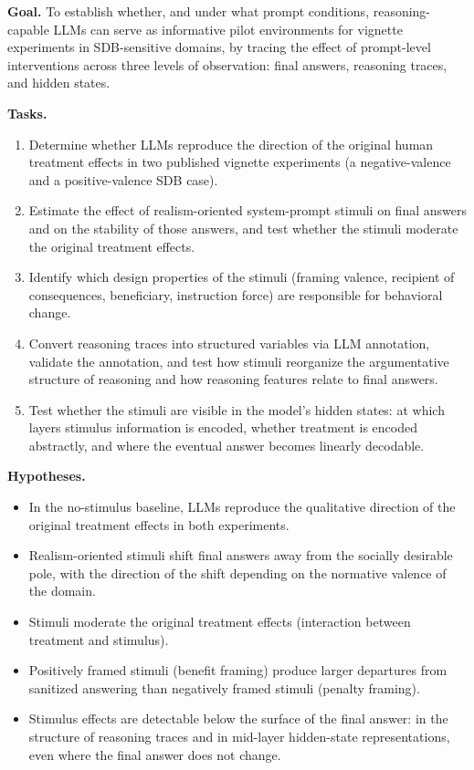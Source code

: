 \documentclass[14pt,a4paper]{extarticle}
\begin{document}
\textbf{Goal.} To establish whether, and under what prompt conditions, reasoning-capable LLMs can serve as informative pilot environments for vignette experiments in SDB-sensitive domains, by tracing the effect of prompt-level interventions across three levels of observation: final answers, reasoning traces, and hidden states.

\textbf{Tasks.}
\begin{enumerate}
    \item Determine whether LLMs reproduce the direction of the original human treatment effects in two published vignette experiments (a negative-valence and a positive-valence SDB case).
    \item Estimate the effect of realism-oriented system-prompt stimuli on final answers and on the stability of those answers, and test whether the stimuli moderate the original treatment effects.
    \item Identify which design properties of the stimuli (framing valence, recipient of consequences, beneficiary, instruction force) are responsible for behavioral change.
    \item Convert reasoning traces into structured variables via LLM annotation, validate the annotation, and test how stimuli reorganize the argumentative structure of reasoning and how reasoning features relate to final answers.
    \item Test whether the stimuli are visible in the model's hidden states: at which layers stimulus information is encoded, whether treatment is encoded abstractly, and where the eventual answer becomes linearly decodable.
\end{enumerate}

\textbf{Hypotheses.}
\begin{itemize}
    \item[H1.] In the no-stimulus baseline, LLMs reproduce the qualitative direction of the original treatment effects in both experiments.
    \item[H2.] Realism-oriented stimuli shift final answers away from the socially desirable pole, with the direction of the shift depending on the normative valence of the domain.
    \item[H3.] Stimuli moderate the original treatment effects (interaction between treatment and stimulus).
    \item[H4.] Positively framed stimuli (benefit framing) produce larger departures from sanitized answering than negatively framed stimuli (penalty framing).
    \item[H5.] Stimulus effects are detectable below the surface of the final answer: in the structure of reasoning traces and in mid-layer hidden-state representations, even where the final answer does not change.
\end{itemize}
\end{document}
